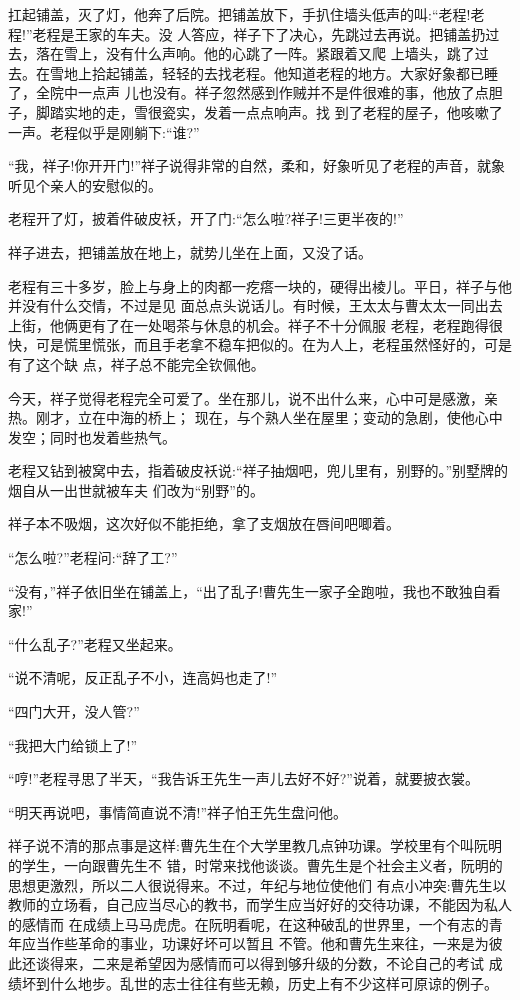 \documentclass[11pt,a4paper,onecolumn]{article}
\begin{document}
扛起铺盖，灭了灯，他奔了后院。把铺盖放下，手扒住墙头低声的叫:``老程!老程!''老程是王家的车夫。没
人答应，祥子下了决心，先跳过去再说。把铺盖扔过去，落在雪上，没有什么声响。他的心跳了一阵。紧跟着又爬
上墙头，跳了过去。在雪地上拾起铺盖，轻轻的去找老程。他知道老程的地方。大家好象都已睡了，全院中一点声
儿也没有。祥子忽然感到作贼并不是件很难的事，他放了点胆子，脚踏实地的走，雪很瓷实，发着一点点响声。找
到了老程的屋子，他咳嗽了一声。老程似乎是刚躺下:``谁?''

``我，祥子!你开开门!''祥子说得非常的自然，柔和，好象听见了老程的声音，就象听见个亲人的安慰似的。

老程开了灯，披着件破皮袄，开了门:``怎么啦?祥子!三更半夜的!''

祥子进去，把铺盖放在地上，就势儿坐在上面，又没了话。

老程有三十多岁，脸上与身上的肉都一疙瘩一块的，硬得出棱儿。平日，祥子与他并没有什么交情，不过是见
面总点头说话儿。有时候，王太太与曹太太一同出去上街，他俩更有了在一处喝茶与休息的机会。祥子不十分佩服
老程，老程跑得很快，可是慌里慌张，而且手老拿不稳车把似的。在为人上，老程虽然怪好的，可是有了这个缺
点，祥子总不能完全钦佩他。

今天，祥子觉得老程完全可爱了。坐在那儿，说不出什么来，心中可是感激，亲热。刚才，立在中海的桥上；
现在，与个熟人坐在屋里；变动的急剧，使他心中发空；同时也发着些热气。

老程又钻到被窝中去，指着破皮袄说:``祥子抽烟吧，兜儿里有，别野的。''别墅牌的烟自从一出世就被车夫
们改为``别野''的。

祥子本不吸烟，这次好似不能拒绝，拿了支烟放在唇间吧唧着。

``怎么啦?''老程问:``辞了工?''

``没有，''祥子依旧坐在铺盖上，``出了乱子!曹先生一家子全跑啦，我也不敢独自看家!''

``什么乱子?''老程又坐起来。

``说不清呢，反正乱子不小，连高妈也走了!''

``四门大开，没人管?''

``我把大门给锁上了!''

``哼!''老程寻思了半天，``我告诉王先生一声儿去好不好?''说着，就要披衣裳。

``明天再说吧，事情简直说不清!''祥子怕王先生盘问他。

祥子说不清的那点事是这样:曹先生在个大学里教几点钟功课。学校里有个叫阮明的学生，一向跟曹先生不
错，时常来找他谈谈。曹先生是个社会主义者，阮明的思想更激烈，所以二人很说得来。不过，年纪与地位使他们
有点小冲突:曹先生以教师的立场看，自己应当尽心的教书，而学生应当好好的交待功课，不能因为私人的感情而
在成绩上马马虎虎。在阮明看呢，在这种破乱的世界里，一个有志的青年应当作些革命的事业，功课好坏可以暂且
不管。他和曹先生来往，一来是为彼此还谈得来，二来是希望因为感情而可以得到够升级的分数，不论自己的考试
成绩坏到什么地步。乱世的志士往往有些无赖，历史上有不少这样可原谅的例子。
\end{document}
